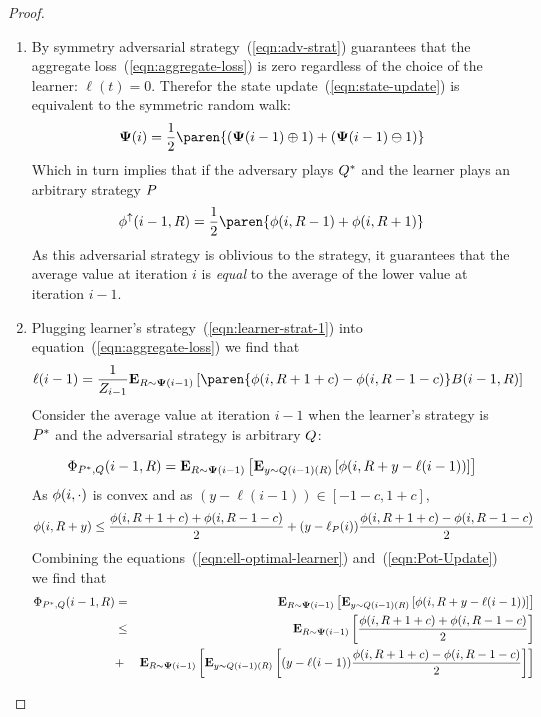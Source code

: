 \documentclass[12pt]{article} %
\begin{document}
\begin{proof}
\begin{enumerate}
\item By symmetry adversarial strategy~(\ref{eqn:adv-strat}) guarantees that
  the aggregate loss~(\ref{eqn:aggregate-loss}) is zero regardless of
  the choice of the learner: $\ell(t)=0$.
  Therefor the state update~(\ref{eqn:state-update}) is equivalent to
  the symmetric random walk:
  $$\state(i) = \frac{1}{2} \paren{(\state(i-1) \oplus 1) + (\state(i-1)
    \ominus 1)}$$
  Which in turn implies that if the adversary plays $Q^*$
  and the learner plays an arbitrary strategy $P$
  \begin{equation} \label{eqn:lower}
    \lowerpot(i-1,\R) = \frac{1}{2} \paren{\pot(i,\R-1)+\pot(i,\R+1)}
  \end{equation}
  As this adversarial strategy is oblivious to the strategy, it
  guarantees that the average value at iteration $i$ is {\em equal} to the
  average of the lower value at iteration $i-1$.
\item
 Plugging learner's strategy~(\ref{eqn:learner-strat-1}) into equation~(\ref{eqn:aggregate-loss}) we find that
 \begin{equation} \label{eqn:ell-optimal-learner}
   \ell(i-1) = \frac{1}{Z_{i-1}} \E{\R \sim \state(i-1)}{\paren{\pot(i,\R+1+c)-\pot(i,\R-1-c)}
   \Bias(i-1,\R)}
\end{equation}
  Consider the average value at iteration $i-1$ when the learner's strategy
  is $P^*$ and the adversarial strategy is arbitrary $Q$:
  
   \begin{equation} \label{eqn:Pot-Update}
    \Phi_{P^*,Q}(i-1,R) = {\bf E}_{R \sim {\bf \Psi}(i-1)}\left[  {\bf E}_{y \sim
      Q(i-1)(R)}\left[ \phi(i,R+y-\ell(i-1)) \right] \right]
  \end{equation}
  As $\phi(i,\cdot)$ is convex and as $(y-\ell(i-1)) \in [-1-c,1+c]$,
  \begin{equation} \label{eqn:pot-upper}
    \phi(i,R+y) \leq \frac{\phi(i,R+1+c)+\phi(i,R-1-c)}{2} +
    (y-\ell_P(i)) \frac{\phi(i,R+1+c)-\phi(i,R-1-c)}{2}
    \end{equation}
  Combining the equations~(\ref{eqn:ell-optimal-learner}) and~(\ref{eqn:Pot-Update}) we find that
  \begin{eqnarray}
  \Phi_{P^*,Q}(i-1,R)&=&{\bf E}_{R \sim {\bf \Psi}(i-1)}\left[ {\bf E}_{y \sim Q(i-1)(R)}\left[ \phi(i,R+y-\ell(i-1)) \right] \right]\\
  &\leq & {\bf E}_{R \sim {\bf \Psi}(i-1)}\left[ \frac{\phi(i,R+1+c)+\phi(i,R-1-c)}{2} \right]\\
  &+&
  {\bf E}_{R \sim {\bf \Psi}(i-1)}\left[ {\bf E}_{y \sim Q(i-1)(R)}\left[ (y-\ell(i-1)) \frac{\phi(i,R+1+c)-\phi(i,R-1-c)}{2} \right] \right] \label{eqn:zero-term}
  \end{eqnarray}
  

\end{enumerate}
\end{proof}
\end{document}
